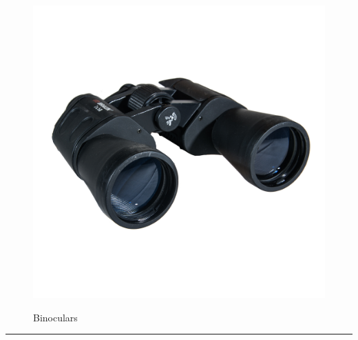 \documentclass{article}
\begin{document}
    \begin{figure}[H]
        \centering
        \begin{minipage}{0.25\textwidth}
            \centering
            \includegraphics[width=\textwidth]{../SurvivalItemImages/binoculars}
        \end{minipage}\hfill
        \begin{minipage}{0.7\textwidth}
            \centering
            \Large Binoculars
        \end{minipage}
    \end{figure}
    \vspace{-0.8em}
    \noindent\rule{\textwidth}{0.4pt}
            
    \clearpage
\end{document}
